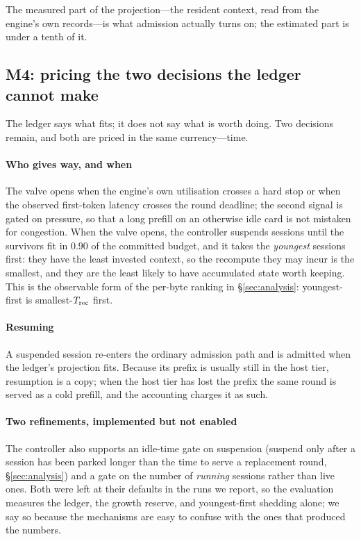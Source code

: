 The measured part of the projection---the resident context, read from the engine's own
records---is what admission actually turns on; the estimated part is under a tenth of it.

\subsection{M4: pricing the two decisions the ledger cannot make}
\label{sec:m4}

The ledger says what fits; it does not say what is worth doing. Two decisions remain, and
both are priced in the same currency---time.

\paragraph{Who gives way, and when} The valve opens when the engine's own utilisation
crosses a hard stop or when the observed first-token latency crosses the round deadline;
the second signal is gated on pressure, so that a long prefill on an otherwise idle card
is not mistaken for congestion. When the valve opens, the controller suspends sessions
until the survivors fit in $0.90$ of the committed budget, and it takes the
\emph{youngest} sessions first: they have the least invested context, so the recompute
they may incur is the smallest, and they are the least likely to have accumulated state
worth keeping. This is the observable form of the per-byte ranking in \S\ref{sec:analysis}:
youngest-first is smallest-$T_{\mathrm{rec}}$ first.

\paragraph{Resuming} A suspended session re-enters the ordinary admission path and is
admitted when the ledger's projection fits. Because its prefix is usually still in the
host tier, resumption is a copy; when the host tier has lost the prefix the same round is
served as a cold prefill, and the accounting charges it as such.

\paragraph{Two refinements, implemented but not enabled} The controller also supports an
idle-time gate on suspension (suspend only after a session has been parked longer than the
time to serve a replacement round, \S\ref{sec:analysis}) and a gate on the number of
\emph{running} sessions rather than live ones. Both were left at their defaults in the runs
we report, so the evaluation measures the ledger, the growth reserve, and youngest-first
shedding alone; we say so because the mechanisms are easy to confuse with the ones that
produced the numbers.

